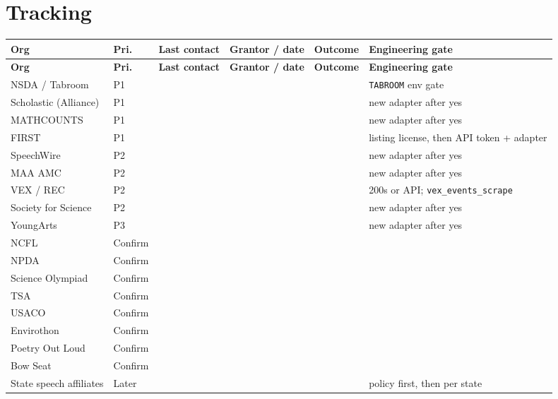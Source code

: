 \documentclass[11pt]{article}
\begin{document}
\section*{Tracking}

{\footnotesize\setlength{\tabcolsep}{3.5pt}
\begin{longtable}{@{}L{0.19\textwidth} L{0.09\textwidth} L{0.13\textwidth} L{0.15\textwidth} L{0.12\textwidth} L{0.22\textwidth}@{}}
\toprule
\textbf{Org} & \textbf{Pri.} & \textbf{Last contact} & \textbf{Grantor / date} & \textbf{Outcome} & \textbf{Engineering gate} \\
\midrule
\endfirsthead
\toprule
\textbf{Org} & \textbf{Pri.} & \textbf{Last contact} & \textbf{Grantor / date} & \textbf{Outcome} & \textbf{Engineering gate} \\
\midrule
\endhead
\bottomrule
\endlastfoot
NSDA / Tabroom & P1 & & & & \texttt{TABROOM} env gate \\[0.85em]
Scholastic (Alliance) & P1 & & & & new adapter after yes \\[0.85em]
MATHCOUNTS & P1 & & & & new adapter after yes \\[0.85em]
FIRST & P1 & & & & listing license, then API token + adapter \\[0.85em]
SpeechWire & P2 & & & & new adapter after yes \\[0.85em]
MAA AMC & P2 & & & & new adapter after yes \\[0.85em]
VEX / REC & P2 & & & & 200s or API; \texttt{vex\_events\_scrape} \\[0.85em]
Society for Science & P2 & & & & new adapter after yes \\[0.85em]
YoungArts & P3 & & & & new adapter after yes \\[0.85em]
NCFL & Confirm & & & & \\[0.85em]
NPDA & Confirm & & & & \\[0.85em]
Science Olympiad & Confirm & & & & \\[0.85em]
TSA & Confirm & & & & \\[0.85em]
USACO & Confirm & & & & \\[0.85em]
Envirothon & Confirm & & & & \\[0.85em]
Poetry Out Loud & Confirm & & & & \\[0.85em]
Bow Seat & Confirm & & & & \\[0.85em]
State speech affiliates & Later & & & & policy first, then per state \\
\end{longtable}
}
\end{document}
